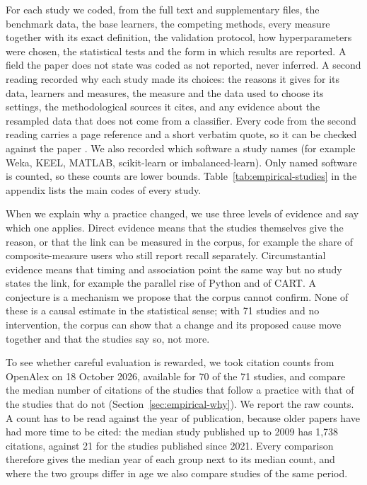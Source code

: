 For each study we coded, from the full text and supplementary files, the benchmark data, the base learners, the competing methods, every measure together with its exact definition, the validation protocol, how hyperparameters were chosen, the statistical tests and the form in which results are reported. A field the paper does not state was coded as not reported, never inferred. A second reading recorded why each study made its choices: the reasons it gives for its data, learners and measures, the measure and the data used to choose its settings, the methodological sources it cites, and any evidence about the resampled data that does not come from a classifier. Every code from the second reading carries a page reference and a short verbatim quote, so it can be checked against the paper . We also recorded which software a study names (for example Weka, KEEL, MATLAB, scikit-learn or imbalanced-learn). Only named software is counted, so these counts are lower bounds. Table~\ref{tab:empirical-studies} in the appendix lists the main codes of every study.

When we explain why a practice changed, we use three levels of evidence and say which one applies. Direct evidence means that the studies themselves give the reason, or that the link can be measured in the corpus, for example the share of composite-measure users who still report recall separately. Circumstantial evidence means that timing and association point the same way but no study states the link, for example the parallel rise of Python and of CART. A conjecture is a mechanism we propose that the corpus cannot confirm. None of these is a causal estimate in the statistical sense; with 71 studies and no intervention, the corpus can show that a change and its proposed cause move together and that the studies say so, not more.

To see whether careful evaluation is rewarded, we took citation counts from OpenAlex on 18 October 2026, available for 70 of the 71 studies, and compare the median number of citations of the studies that follow a practice with that of the studies that do not (Section~\ref{sec:empirical-why}). We report the raw counts. A count has to be read against the year of publication, because older papers have had more time to be cited: the median study published up to 2009 has 1,738 citations, against 21 for the studies published since 2021. Every comparison therefore gives the median year of each group next to its median count, and where the two groups differ in age we also compare studies of the same period.


